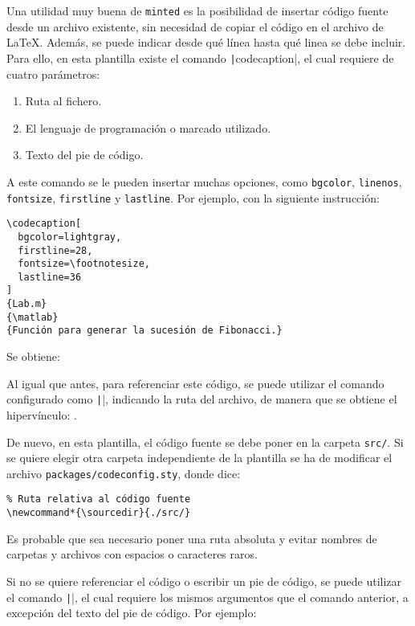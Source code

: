 \documentclass[../main.tex]{subfile}
\begin{document}
    Una utilidad muy buena de \texttt{minted} es la posibilidad de insertar código fuente desde un archivo existente, sin necesidad de copiar el código en el archivo de LaTeX. Además, se puede indicar desde qué línea hasta qué linea se debe incluir. Para ello, en esta plantilla existe el comando \texttt|codecaption|, el cual requiere de cuatro parámetros:

    \begin{enumerate}
      \item Ruta al fichero.
      \item El lenguaje de programación o marcado utilizado.
      \item Texto del pie de código.
    \end{enumerate}

    A este comando se le pueden insertar muchas opciones, como \texttt{bgcolor}, \texttt{linenos}, \texttt{fontsize}, \texttt{firstline} y \texttt{lastline}. Por ejemplo, con la siguiente instrucción:

    \begin{verbatim}
\codecaption[
  bgcolor=lightgray,
  firstline=28,
  fontsize=\footnotesize,
  lastline=36
]
{Lab.m}
{\matlab}
{Función para generar la sucesión de Fibonacci.}
    \end{verbatim}

    Se obtiene:


    Al igual que antes, para referenciar este código, se puede utilizar el comando configurado como \texttt||, indicando la ruta del archivo, de manera que se obtiene el hipervínculo: .

    De nuevo, en esta plantilla, el código fuente se debe poner en la carpeta \texttt{src/}. Si se quiere elegir otra carpeta independiente de la plantilla se ha de modificar el archivo \texttt{packages/codeconfig.sty}, donde dice:

    \begin{verbatim}
% Ruta relativa al código fuente
\newcommand*{\sourcedir}{./src/}
    \end{verbatim}

    Es probable que sea necesario poner una ruta absoluta y evitar nombres de carpetas y archivos con espacios o caracteres raros.

    Si no se quiere referenciar el código o escribir un pie de código, se puede utilizar el comando \texttt|\codenocaption|, el cual requiere los mismos argumentos que el comando anterior, a excepción del texto del pie de código. Por ejemplo:
\end{document}
